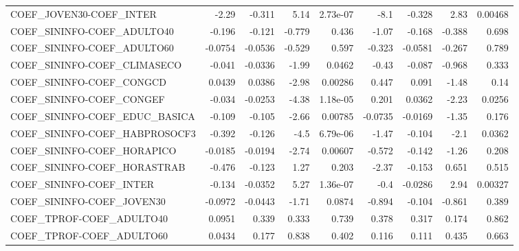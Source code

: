 \begin{tabular}{lrrrrrrrr}
COEF\_JOVEN30-COEF\_INTER               &       -2.29 &       -0.311 &     5.14 & 2.73e-07 &       -8.1 &      -0.328 &         2.83 &       0.00468 \\
COEF\_SININFO-COEF\_ADULTO40            &      -0.196 &       -0.121 &   -0.779 &    0.436 &      -1.07 &      -0.168 &       -0.388 &         0.698 \\
COEF\_SININFO-COEF\_ADULTO60            &     -0.0754 &      -0.0536 &   -0.529 &    0.597 &     -0.323 &     -0.0581 &       -0.267 &         0.789 \\
COEF\_SININFO-COEF\_CLIMASECO           &      -0.041 &      -0.0336 &    -1.99 &   0.0462 &      -0.43 &      -0.087 &       -0.968 &         0.333 \\
COEF\_SININFO-COEF\_CONGCD              &      0.0439 &       0.0386 &    -2.98 &  0.00286 &      0.447 &       0.091 &        -1.48 &          0.14 \\
COEF\_SININFO-COEF\_CONGEF              &      -0.034 &      -0.0253 &    -4.38 & 1.18e-05 &      0.201 &      0.0362 &        -2.23 &        0.0256 \\
COEF\_SININFO-COEF\_EDUC\_BASICA         &      -0.109 &       -0.105 &    -2.66 &  0.00785 &    -0.0735 &     -0.0169 &        -1.35 &         0.176 \\
COEF\_SININFO-COEF\_HABPROSOCF3         &      -0.392 &       -0.126 &     -4.5 & 6.79e-06 &      -1.47 &      -0.104 &         -2.1 &        0.0362 \\
COEF\_SININFO-COEF\_HORAPICO            &     -0.0185 &      -0.0194 &    -2.74 &  0.00607 &     -0.572 &      -0.142 &        -1.26 &         0.208 \\
COEF\_SININFO-COEF\_HORASTRAB           &      -0.476 &       -0.123 &     1.27 &    0.203 &      -2.37 &      -0.153 &        0.651 &         0.515 \\
COEF\_SININFO-COEF\_INTER               &      -0.134 &      -0.0352 &     5.27 & 1.36e-07 &       -0.4 &     -0.0286 &         2.94 &       0.00327 \\
COEF\_SININFO-COEF\_JOVEN30             &     -0.0972 &      -0.0443 &    -1.71 &   0.0874 &     -0.894 &      -0.104 &       -0.861 &         0.389 \\
COEF\_TPROF-COEF\_ADULTO40              &      0.0951 &        0.339 &    0.333 &    0.739 &      0.378 &       0.317 &        0.174 &         0.862 \\
COEF\_TPROF-COEF\_ADULTO60              &      0.0434 &        0.177 &    0.838 &    0.402 &      0.116 &       0.111 &        0.435 &         0.663 \\

\end{tabular}
